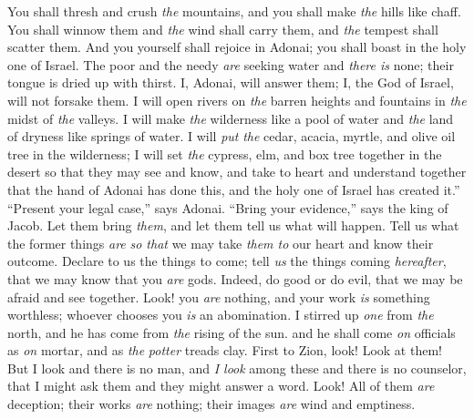 \begin{biblechapter}
You shall thresh and crush \textit{the} mountains, 
and you shall make \textit{the} hills like chaff.
\verse You shall winnow them and \textit{the} wind shall carry them, 
and \textit{the} tempest shall scatter them. 
And you yourself shall rejoice in Adonai; 
you shall boast in the holy one of Israel.
\verse The poor and the needy \textit{are} seeking water and \textit{there is} none; 
their tongue is dried up with thirst. 
I, Adonai, will answer them; 
I, the God of Israel, will not forsake them.
\verse I will open rivers on \textit{the} barren heights 
and fountains in \textit{the} midst of \textit{the} valleys. 
I will make \textit{the} wilderness like a pool of water 
and \textit{the} land of dryness like springs of water.
\verse I will \textit{put} \textit{the} cedar, acacia, myrtle, and olive oil tree in the wilderness; 
I will set \textit{the} cypress, elm, and box tree together in the desert
\verse so that they may see and know, 
and take to heart and understand together 
that the hand of Adonai has done this, 
and the holy one of Israel has created it.”
\verse “Present your legal case,” says Adonai. 
“Bring your evidence,” says the king of Jacob.
\verse Let them bring \textit{them}, 
and let them tell us what will happen. 
Tell us what the former things \textit{are} 
\textit{so that} we may take \textit{them to} our heart 
and know their outcome. 
Declare to us the things to come;
\verse tell \textit{us} the things coming \textit{hereafter}, 
that we may know that you \textit{are} gods. 
Indeed, do good or do evil, 
that we may be afraid and see together.
\verse Look! you \textit{are} nothing, 
and your work \textit{is} something worthless; 
whoever chooses you \textit{is} an abomination.
\verse I stirred up \textit{one} from \textit{the} north, 
and he has come from \textit{the} rising of the sun.
\verse and he shall come \textit{on} officials as \textit{on} mortar, 
and as \textit{the} \textit{potter} treads clay.
\verse First to Zion, look! Look at them!
\verse But I look and there is no man, 
and \textit{I look} among these and there is no counselor, 
that I might ask them and they might answer a word.
\verse Look! All of them \textit{are} deception; 
their works \textit{are} nothing; 
their images \textit{are} wind and emptiness.
\end{biblechapter}

